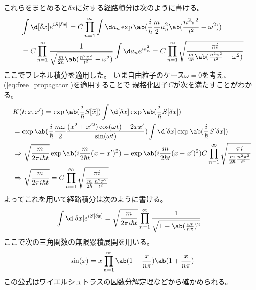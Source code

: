 これらをまとめると$\delta x$に対する経路積分は次のように書ける。
\begin{equation}
  \begin{split}
    &\int\d[\delta x]e^{iS[\delta x]}
    =C\prod_{n=1}^\infty\int\d a_n
    \exp\ab(\frac{i}{\hbar}\frac{m}{2}a_n^2\ab(\frac{n^2\pi^2}{t^2}-\omega^2)) \\
    &=C\prod_{n=1}^\infty
    \frac{1}{\sqrt{\frac{m}{2\hbar}\ab(\frac{n^2\pi^2}{t^2}-\omega^2)}}
    \int\d a_n e^{ia_n^2}
    =C\prod_{n=1}^\infty
    \sqrt{\frac{\pi i}{\frac{m}{2\hbar}\ab(\frac{n^2\pi^2}{t^2}-\omega^2)}}
  \end{split}
\end{equation}
ここでフレネル積分を適用した。
いま自由粒子のケース$\omega=0$を考え、
(\ref{eq:free_propagator})を適用することで
規格化因子$C$が次を満たすことがわかる。
\begin{equation}
  \begin{split}
    &K(t;x,x')
    =\exp\ab(\frac{i}{\hbar}S[\bar{x}])
    \int\d[\delta x]\exp\ab(\frac{i}{\hbar}S[\delta x]) \\
    &=\exp\ab(\frac{i}{\hbar}
    \frac{m\omega}{2}\frac{
        (x^2+x'^2)\cos(\omega t)-2xx'
      }{\sin(\omega t)})
    \int\d[\delta x]\exp\ab(\frac{i}{\hbar}S[\delta x]) \\
    &\Rightarrow
    \sqrt{\frac{m}{2\pi i\hbar t}}
    \exp\ab(i\frac{m}{2\hbar t}(x-x')^2)
    =\exp\ab(i
    \frac{m}{2\hbar t}(x-x')^2)
    C\prod_{n=1}^\infty
    \sqrt{\frac{\pi i}{\frac{m}{2\hbar}\frac{n^2\pi^2}{t^2}}} \\
    &\Rightarrow
    \sqrt{\frac{m}{2\pi i\hbar t}}
    =C\prod_{n=1}^\infty
    \sqrt{\frac{\pi i}{\frac{m}{2\hbar}\frac{n^2\pi^2}{t^2}}} \\
  \end{split}
\end{equation}
よってこれを用いて経路積分は次のように書ける。
\begin{equation}
  \begin{split}
    &\int\d[\delta x]e^{iS[\delta x]}
    =\sqrt{\frac{m}{2\pi i\hbar t}}
    \prod_{n=1}^\infty
    \frac{1}{\sqrt{1-\ab(\frac{\omega t}{n\pi})^2}}
  \end{split}
\end{equation}
ここで次の三角関数の無限累積展開を用いる。
\begin{equation}
  \sin(x)
  =x\prod_{n=1}^\infty\ab(1-\frac{x}{n\pi})\ab(1+\frac{x}{n\pi})
\end{equation}
この公式はワイエルシュトラスの因数分解定理などから確かめられる。
